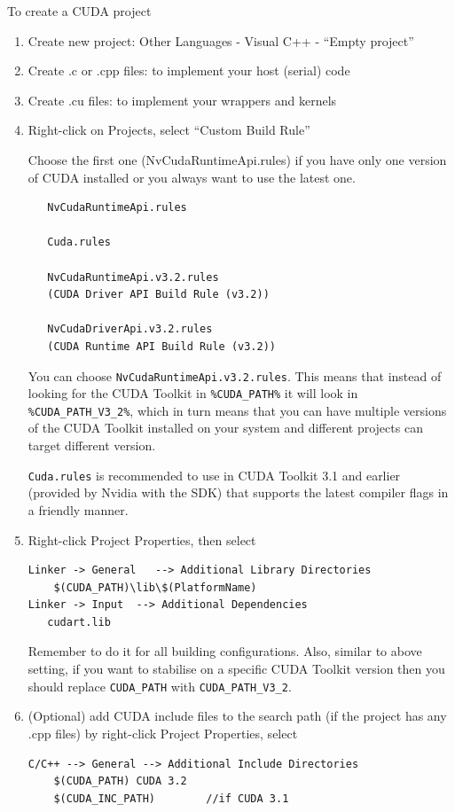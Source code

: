 To create a CUDA project
\begin{enumerate}
  \item Create new project: Other Languages - Visual C++ - ``Empty project''
  
   \item Create .c or .cpp files: to implement your host (serial) code 
   \item Create .cu files: to implement your wrappers and kernels
   \item Right-click on Projects, select ``Custom Build Rule''
   
   Choose the first one (NvCudaRuntimeApi.rules) if you have only one version of
   CUDA installed or you always want to use the latest one.
   \begin{verbatim}
   NvCudaRuntimeApi.rules 
   
   Cuda.rules
   
   NvCudaRuntimeApi.v3.2.rules
   (CUDA Driver API Build Rule (v3.2))
   
   NvCudaDriverApi.v3.2.rules
   (CUDA Runtime API Build Rule (v3.2))
   \end{verbatim}
  You can choose \verb!NvCudaRuntimeApi.v3.2.rules!. This means that instead
  of looking for the CUDA Toolkit in \verb!%CUDA_PATH%! it will look in
  \verb!%CUDA_PATH_V3_2%!, which in turn means that you can have multiple
  versions of the CUDA Toolkit installed on your system and different projects
  can target different version.
   
  \verb!Cuda.rules! is recommended to use in CUDA Toolkit 3.1 and earlier
  (provided by Nvidia with the SDK) that supports the latest compiler flags in a
  friendly manner. 
   
   \item Right-click Project Properties, then select
   \begin{verbatim}
Linker -> General   --> Additional Library Directories
    $(CUDA_PATH)\lib\$(PlatformName)
Linker -> Input  --> Additional Dependencies
   cudart.lib    
   \end{verbatim}
 Remember to do it for all building configurations.
 Also, similar to above setting, if you want to stabilise on a specific CUDA
 Toolkit version then you should replace \verb!CUDA_PATH! with \verb!CUDA_PATH_V3_2!.   
   
   \item (Optional) add CUDA include files to the search path (if the project
   has any .cpp files) by right-click Project Properties, select
 \begin{verbatim}
C/C++ --> General --> Additional Include Directories
    $(CUDA_PATH) CUDA 3.2
    $(CUDA_INC_PATH)		//if CUDA 3.1
 \end{verbatim}
   

\end{enumerate}
